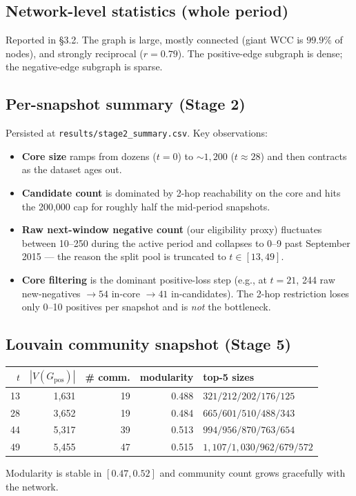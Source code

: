 \documentclass[11pt,a4paper]{article}
\newcommand{\code}[1]{\texttt{#1}}
\begin{document}
\subsection{Network-level statistics (whole period)}
Reported in \S3.2. The graph is large, mostly connected (giant WCC is $99.9\%$
of nodes), and strongly reciprocal ($r = 0.79$). The positive-edge subgraph
is dense; the negative-edge subgraph is sparse.

\subsection{Per-snapshot summary (Stage 2)}
Persisted at \code{results/stage2\_summary.csv}. Key observations:
\begin{itemize}[nosep]
  \item \textbf{Core size} ramps from dozens ($t = 0$) to ${\sim}1{,}200$
        ($t \approx 28$) and then contracts as the dataset ages out.
  \item \textbf{Candidate count} is dominated by 2-hop reachability on the
        core and hits the 200{,}000 cap for roughly half the mid-period
        snapshots.
  \item \textbf{Raw next-window negative count} (our eligibility proxy)
        fluctuates between 10--250 during the active period and collapses to
        0--9 past September 2015 --- the reason the split pool is truncated
        to $t \in [13, 49]$.
  \item \textbf{Core filtering} is the dominant positive-loss step (e.g., at
        $t = 21$, 244 raw new-negatives $\to 54$ in-core $\to 41$
        in-candidates). The 2-hop restriction loses only 0--10 positives per
        snapshot and is \emph{not} the bottleneck.
\end{itemize}

\subsection{Louvain community snapshot (Stage 5)}
\begin{center}
\small
\begin{tabular}{rrrrl}
\toprule
$t$ & $|V(G_{\mathrm{pos}})|$ & \# comm. & modularity & top-5 sizes \\
\midrule
13 & 1{,}631 & 19 & 0.488 & $321/212/202/176/125$ \\
28 & 3{,}652 & 19 & 0.484 & $665/601/510/488/343$ \\
44 & 5{,}317 & 39 & 0.513 & $994/956/870/763/654$ \\
49 & 5{,}455 & 47 & 0.515 & $1{,}107/1{,}030/962/679/572$ \\
\bottomrule
\end{tabular}
\end{center}
Modularity is stable in $[0.47, 0.52]$ and community count grows gracefully
with the network.
\end{document}
